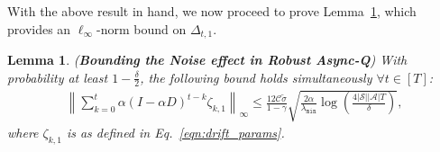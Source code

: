 \documentclass{article}
\newcommand{\mc}{\mathcal}
\newtheorem{lemma}{Lemma}
\begin{document}
With the above result in hand, we now proceed to prove Lemma~\ref{lemma:noise_in_adversaries}, which provides an \(\ell_{\infty}\)-norm bound on \(\Delta_{t,1}\).
\begin{lemma}
\label{lemma:noise_in_adversaries} (\textbf{Bounding the Noise effect in Robust Async-Q}) With probability at least $1- \frac{\delta}{2}$, the following bound holds simultaneously $\forall t \in [T]$: 
\begin{equation}
\begin{aligned}
     \left\lVert \sum_{k=0}^{t} \alpha (I - \alpha D)^{t-k} \zeta_{k,1} \right\rVert_\infty \le \frac{12 \mc{C} \tilde{\sigma}}{1-\gamma} \sqrt{\frac{2\alpha}{ \lambda_{\texttt{min}}} \log \left( \frac{4\lvert\mathcal{S}\rvert\lvert\mathcal{A}\rvert T}{\delta} \right)},
\end{aligned}
\end{equation}
where \(\zeta_{k,1}\) is as defined in Eq.~\eqref{eqn:drift_params}.
\end{lemma}
\end{document}
